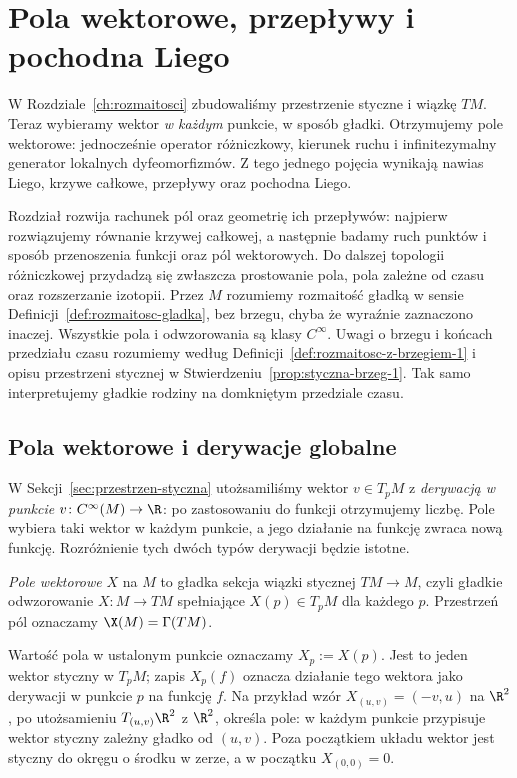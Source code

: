 \chapter{Pola wektorowe, przepływy i pochodna Liego}
\label{ch:pola}

W Rozdziale~\ref{ch:rozmaitosci} zbudowaliśmy przestrzenie styczne i wiązkę $TM$.
Teraz wybieramy wektor \emph{w każdym} punkcie, w sposób gładki.
Otrzymujemy pole wektorowe: jednocześnie operator
różniczkowy, kierunek ruchu i infinitezymalny generator lokalnych dyfeomorfizmów.
Z tego jednego pojęcia wynikają nawias Liego, krzywe całkowe, przepływy oraz
pochodna Liego.

Rozdział rozwija rachunek pól oraz geometrię ich przepływów: najpierw
rozwiązujemy równanie krzywej całkowej, a następnie badamy ruch
punktów i sposób przenoszenia funkcji oraz pól wektorowych.
Do dalszej topologii różniczkowej przydadzą się zwłaszcza prostowanie
pola, pola zależne od czasu oraz rozszerzanie izotopii.
Przez $M$ rozumiemy rozmaitość gładką w sensie Definicji~\ref{def:rozmaitosc-gladka},
bez brzegu, chyba że wyraźnie zaznaczono inaczej.
Wszystkie pola i odwzorowania są klasy $C^\infty$.
Uwagi o brzegu i końcach przedziału czasu rozumiemy
według Definicji~\ref{def:rozmaitosc-z-brzegiem-1}
i opisu przestrzeni stycznej w
Stwierdzeniu~\ref{prop:styczna-brzeg-1}.
Tak samo interpretujemy gładkie rodziny na domkniętym przedziale czasu.



\section{Pola wektorowe i derywacje globalne}
\label{sec:derywacje}

W Sekcji~\ref{sec:przestrzen-styczna} utożsamiliśmy wektor $v\in T_pM$ z
\emph{derywacją w punkcie} $v\colon C^\infty(M)\to\R$:
po zastosowaniu do funkcji otrzymujemy liczbę. Pole wybiera taki
wektor w każdym punkcie, a jego działanie na funkcję zwraca nową
funkcję. Rozróżnienie tych dwóch typów derywacji będzie istotne.

\begin{definicja}
\emph{Pole wektorowe} $X$ na $M$ to gładka sekcja wiązki stycznej
$TM\to M$, czyli gładkie odwzorowanie $X\colon M\to TM$ spełniające
$X(p)\in T_pM$ dla każdego $p$. Przestrzeń pól oznaczamy $\X(M)=\Gamma(TM)$.
\end{definicja}

Wartość pola w ustalonym punkcie oznaczamy $X_p:=X(p)$.
Jest to jeden wektor styczny w $T_pM$; zapis $X_p(f)$ oznacza
działanie tego wektora jako derywacji w punkcie $p$ na funkcję $f$.
Na przykład wzór $X_{(u,v)}=(-v,u)$ na $\R^2$, po utożsamieniu
$T_{(u,v)}\R^2$ z $\R^2$, określa pole:
w każdym punkcie przypisuje wektor styczny zależny gładko od $(u,v)$.
Poza początkiem układu wektor jest styczny do okręgu o środku w zerze,
a w początku $X_{(0,0)}=0$.

